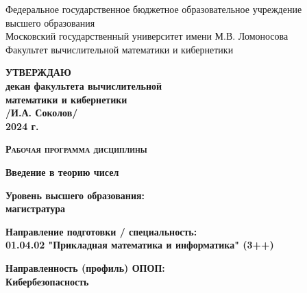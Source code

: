\documentclass[a4paper, 12pt]{article}
\begin{document}
\begin{titlepage}

    \centering

    Федеральное государственное бюджетное образовательное учреждение\\
    высшего образования \\
    Московский государственный университет имени М.В. Ломоносова\\
    Факультет вычислительной математики и кибернетики

    \vspace{24pt}

    \begin{flushright}
        \textbf{
        УТВЕРЖДАЮ\\
        декан факультета вычислительной\\
        математики и кибернетики\\
        \vspace{12pt}
        \underline{\hspace{2.5cm}} /И.А. Соколов/\\
        \flqq \underline{\hspace{1cm}}\frqq \underline{\hspace{3cm}} 2024 г.}
    \end{flushright}

    \vspace{24pt}

    \textbf{\textsc{Рабочая программа дисциплины}}

    \vspace{8pt}

    \textbf{Введение в теорию чисел}

    \underline{\hspace{15cm}}

    \vspace{24pt}

    \textbf{Уровень высшего образования:\\
    магистратура}

    \vspace{16pt}

    \textbf{Направление подготовки / специальность:\\
    01.04.02 "Прикладная математика и информатика" (3++)}

    \vspace{16pt}

    \textbf{Направленность (профиль) ОПОП:\\
    Кибербезопасность}


\end{titlepage}
\end{document}
